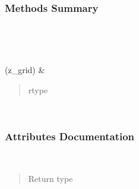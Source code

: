 \documentclass[letterpaper,10pt,english]{sphinxmanual}
\begin{document}
\begin{fulllineitems}
\begin{savenotes}
\begin{longtable}[c]{}
\begin{quote}
\begin{description}
\end{description}\end{quote}

\\
\hline
\end{longtable}\sphinxatlongtableend\end{savenotes}
\subsubsection*{Methods Summary}


\begin{savenotes}\sphinxatlongtablestart\begin{longtable}[c]{}
\hline

\endfirsthead

%
{}\\
\hline

\endhead

\hline
{}\\
\endfoot

\endlastfoot

\sphinxAtStartPar
{\hyperref[\detokenize{api/seyfert.cosmology.bias.BiasModel:seyfert.cosmology.bias.BiasModel.computeBias}]{}}(z\_grid)
&
\sphinxAtStartPar
\begin{quote}\begin{description}
\item[{rtype}] \leavevmode
\sphinxAtStartPar
{}

\end{description}\end{quote}

\\
\hline
\end{longtable}\sphinxatlongtableend\end{savenotes}
\subsubsection*{Attributes Documentation}

\begin{fulllineitems}
\label{\detokenize{api/seyfert.cosmology.bias.BiasModel:seyfert.cosmology.bias.BiasModel.n_bins}}~\begin{quote}\begin{description}
\item[{Return type}] \leavevmode
\sphinxAtStartPar
{}


\end{description}
\end{quote}
\end{fulllineitems}
\end{fulllineitems}
\end{document}
